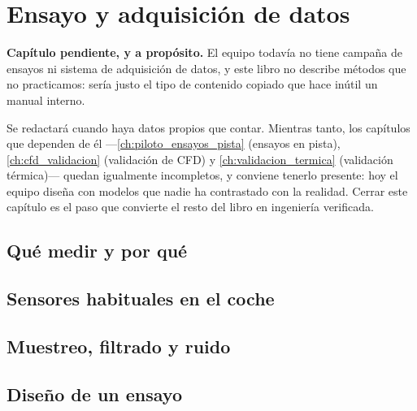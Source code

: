 \chapter{Ensayo y adquisición de datos}
\label{ch:ensayo_adquisicion_datos}

\begin{clave}
\textbf{Capítulo pendiente, y a propósito.} El equipo todavía no tiene campaña de
ensayos ni sistema de adquisición de datos, y este libro no describe métodos que
no practicamos: sería justo el tipo de contenido copiado que hace inútil un
manual interno.

Se redactará cuando haya datos propios que contar. Mientras tanto, los capítulos
que dependen de él ---\ref{ch:piloto_ensayos_pista} (ensayos en pista),
\ref{ch:cfd_validacion} (validación de CFD) y \ref{ch:validacion_termica}
(validación térmica)--- quedan igualmente incompletos, y conviene tenerlo
presente: hoy el equipo diseña con modelos que nadie ha contrastado con la
realidad. Cerrar este capítulo es el paso que convierte el resto del libro en
ingeniería verificada.
\end{clave}


\section{Qué medir y por qué}
\label{sec:ensayo_adquisicion_datos:01}

\section{Sensores habituales en el coche}
\label{sec:ensayo_adquisicion_datos:02}

\section{Muestreo, filtrado y ruido}
\label{sec:ensayo_adquisicion_datos:03}

\section{Diseño de un ensayo}
\label{sec:ensayo_adquisicion_datos:04}

